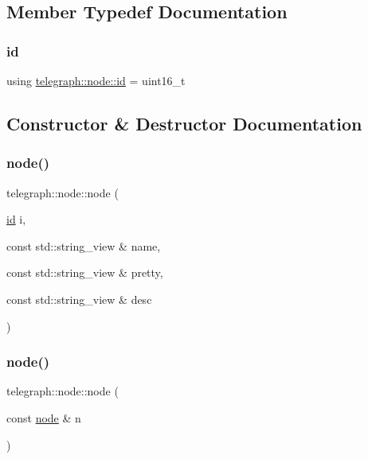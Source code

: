 \subsection{Member Typedef Documentation}
\mbox{\label{classtelegraph_1_1node_a90bc576d668ed141d5354a06aa9c8d9a}} 
\subsubsection{\texorpdfstring{id}{id}}
{\footnotesize\ttfamily using \hyperlink{classtelegraph_1_1node_a90bc576d668ed141d5354a06aa9c8d9a}{telegraph\+::node\+::id} =  uint16\+\_\+t}



\subsection{Constructor \& Destructor Documentation}
\mbox{\label{classtelegraph_1_1node_a6891eb034aa7d988f1459d3ed2bc0106}} 
\subsubsection{\texorpdfstring{node()}{node()}\hspace{0.1cm}{\footnotesize\ttfamily [1/2]}}
{\footnotesize\ttfamily telegraph\+::node\+::node (\begin{DoxyParamCaption}\item[{\hyperlink{classtelegraph_1_1node_a90bc576d668ed141d5354a06aa9c8d9a}{id}}]{i,  }\item[{const std\+::string\+\_\+view \&}]{name,  }\item[{const std\+::string\+\_\+view \&}]{pretty,  }\item[{const std\+::string\+\_\+view \&}]{desc }\end{DoxyParamCaption})\hspace{0.3cm}{\ttfamily [inline]}}

\mbox{\label{classtelegraph_1_1node_a76746ee2232620309c5f60ca94af24ee}} 
\subsubsection{\texorpdfstring{node()}{node()}\hspace{0.1cm}{\footnotesize\ttfamily [2/2]}}
{\footnotesize\ttfamily telegraph\+::node\+::node (\begin{DoxyParamCaption}\item[{const \hyperlink{classtelegraph_1_1node}{node} \&}]{n }\end{DoxyParamCaption})\hspace{0.3cm}{\ttfamily [inline]}}

